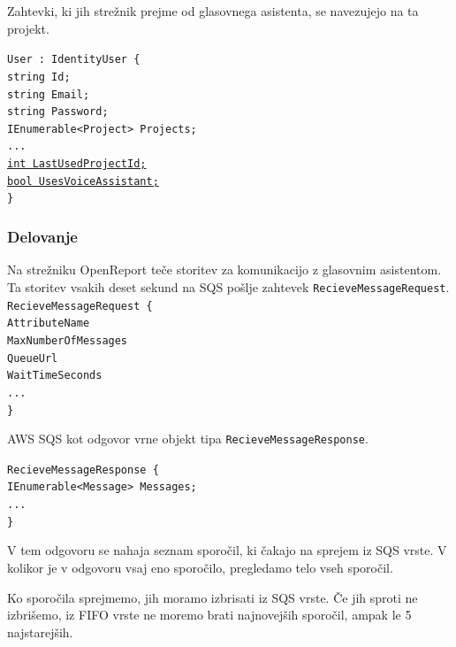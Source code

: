 \documentclass[a4paper, 12pt]{book}
\begin{document}
Zahtevki, ki jih strežnik prejme od glasovnega asistenta, se navezujejo na ta projekt.

\noindent \texttt{User : IdentityUser \{ \\
string Id; \\
string Email; \\
string Password; \\
IEnumerable<Project> Projects; \\
... \\
\underline{int LastUsedProjectId;} \\
\underline{bool UsesVoiceAssistant;} \\
\}}

\subsubsection{Delovanje}

Na strežniku OpenReport teče storitev za komunikacijo z glasovnim asistentom.
Ta storitev vsakih deset sekund na SQS pošlje zahtevek \texttt{RecieveMessageRequest}.
\noindent\texttt{RecieveMessageRequest \{ \\
AttributeName \\ %
MaxNumberOfMessages \\ %
QueueUrl \\ %
WaitTimeSeconds \\ %
... \\
\} 
}

AWS SQS kot odgovor vrne objekt tipa \texttt{RecieveMessageResponse}.

\noindent\texttt{RecieveMessageResponse \{ \\
IEnumerable<Message> Messages;\\
... \\
\} }

V tem odgovoru se nahaja seznam sporočil, ki čakajo na sprejem iz SQS vrste.
V kolikor je v odgovoru vsaj eno sporočilo, pregledamo telo vseh sporočil. 

Ko sporočila sprejmemo, jih moramo izbrisati iz SQS vrste.
Če jih sproti ne izbrišemo, iz FIFO vrste ne moremo brati najnovejših sporočil, ampak le 5 najstarejših.
\end{document}
